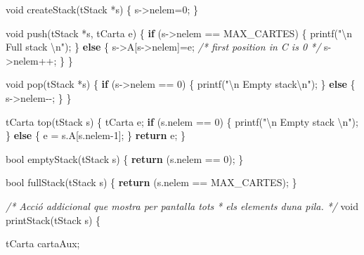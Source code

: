 \documentclass[
]{book}
\newenvironment{Shaded}{\begin{snugshade}}{\end{snugshade}}
\newcommand{\CommentTok}[1]{\textcolor[rgb]{0.56,0.35,0.01}{\textit{#1}}}
\newcommand{\ControlFlowTok}[1]{\textcolor[rgb]{0.13,0.29,0.53}{\textbf{#1}}}
\newcommand{\DataTypeTok}[1]{\textcolor[rgb]{0.13,0.29,0.53}{#1}}
\newcommand{\DecValTok}[1]{\textcolor[rgb]{0.00,0.00,0.81}{#1}}
\newcommand{\NormalTok}[1]{#1}
\newcommand{\SpecialCharTok}[1]{\textcolor[rgb]{0.00,0.00,0.00}{#1}}
\newcommand{\StringTok}[1]{\textcolor[rgb]{0.31,0.60,0.02}{#1}}
\begin{document}
\begin{Shaded}
\begin{Highlighting}[]
\DataTypeTok{void}\NormalTok{ createStack(tStack *s) \{}
\NormalTok{    s{-}\textgreater{}nelem=}\DecValTok{0}\NormalTok{;}
\NormalTok{\}}

\DataTypeTok{void}\NormalTok{ push(tStack *s, tCarta e) \{}
    \ControlFlowTok{if}\NormalTok{ (s{-}\textgreater{}nelem == MAX\_CARTES) \{}
\NormalTok{        printf(}\StringTok{"}\SpecialCharTok{\textbackslash{}n}\StringTok{ Full stack }\SpecialCharTok{\textbackslash{}n}\StringTok{"}\NormalTok{);}
\NormalTok{    \} }\ControlFlowTok{else}\NormalTok{ \{}
\NormalTok{        s{-}\textgreater{}A[s{-}\textgreater{}nelem]=e; }\CommentTok{/* first position in C is 0 */}
\NormalTok{        s{-}\textgreater{}nelem++;}
\NormalTok{    \}}
\NormalTok{\}}

\DataTypeTok{void}\NormalTok{ pop(tStack *s) \{}
    \ControlFlowTok{if}\NormalTok{ (s{-}\textgreater{}nelem == }\DecValTok{0}\NormalTok{) \{}
\NormalTok{        printf(}\StringTok{"}\SpecialCharTok{\textbackslash{}n}\StringTok{ Empty stack}\SpecialCharTok{\textbackslash{}n}\StringTok{"}\NormalTok{);}
\NormalTok{    \} }\ControlFlowTok{else}\NormalTok{ \{}
\NormalTok{        s{-}\textgreater{}nelem{-}{-};}
\NormalTok{    \}}
\NormalTok{\}}

\NormalTok{tCarta top(tStack s) \{}
\NormalTok{    tCarta e;}
    \ControlFlowTok{if}\NormalTok{ (s.nelem == }\DecValTok{0}\NormalTok{) \{}
\NormalTok{        printf(}\StringTok{"}\SpecialCharTok{\textbackslash{}n}\StringTok{ Empty stack }\SpecialCharTok{\textbackslash{}n}\StringTok{"}\NormalTok{);}
\NormalTok{    \} }\ControlFlowTok{else}\NormalTok{ \{}
\NormalTok{        e = s.A[s.nelem{-}}\DecValTok{1}\NormalTok{];}
\NormalTok{    \}}
    \ControlFlowTok{return}\NormalTok{ e;}
\NormalTok{\}}

\DataTypeTok{bool}\NormalTok{ emptyStack(tStack s) \{}
    \ControlFlowTok{return}\NormalTok{ (s.nelem == }\DecValTok{0}\NormalTok{);}
\NormalTok{\}}

\DataTypeTok{bool}\NormalTok{ fullStack(tStack s) \{}
    \ControlFlowTok{return}\NormalTok{ (s.nelem == MAX\_CARTES);}
\NormalTok{\}}

\CommentTok{/* Acció addicional que mostra per pantalla tots }
\CommentTok{ * els elements d\textquotesingle{}una pila. }
\CommentTok{ */}
\DataTypeTok{void}\NormalTok{ printStack(tStack s) \{}
    
\NormalTok{    tCarta cartaAux;}
    

\end{Highlighting}
\end{Shaded}
\end{document}
